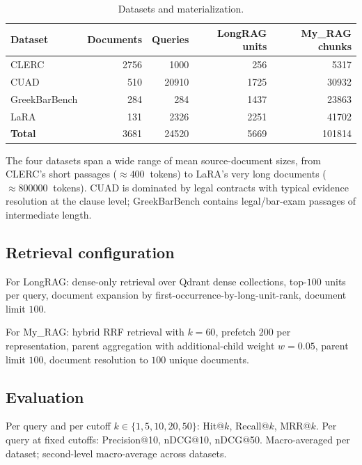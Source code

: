 \documentclass[11pt,a4paper]{article}
\begin{document}
\begin{table}[h]
\centering
\caption{Datasets and materialization.}
\label{tab:datasets}
\small
\begin{tabular}{l r r r r}
\toprule
\textbf{Dataset} & \textbf{Documents} & \textbf{Queries}
  & \textbf{LongRAG units} & \textbf{My\_RAG chunks} \\
\midrule
CLERC              & \num{2756} & \num{1000}  & \num{256}   & \num{5317} \\
CUAD               & \num{510}  & \num{20910} & \num{1725}  & \num{30932} \\
GreekBarBench      & \num{284}  & \num{284}   & \num{1437}  & \num{23863} \\
LaRA               & \num{131}  & \num{2326}  & \num{2251}  & \num{41702} \\
\midrule
\textbf{Total}     & \num{3681} & \num{24520} & \num{5669}  & \num{101814} \\
\bottomrule
\end{tabular}
\end{table}

The four datasets span a wide range of mean source-document sizes,
from CLERC's short passages ($\approx \SI{400}{}$ tokens) to LaRA's
very long documents ($\approx \SI{800000}{}$ tokens). CUAD is
dominated by legal contracts with typical evidence resolution at the
clause level; GreekBarBench contains legal/bar-exam passages of
intermediate length.

\subsection{Retrieval configuration}
For LongRAG: dense-only retrieval over Qdrant dense collections,
top-$100$ units per query, document expansion by
first-occurrence-by-long-unit-rank, document limit $100$.

For My\_RAG: hybrid RRF retrieval with $k=60$, prefetch $200$ per
representation, parent aggregation with additional-child weight
$w = 0.05$, parent limit $100$, document resolution to $100$
unique documents.

\subsection{Evaluation}
Per query and per cutoff $k \in \{1, 5, 10, 20, 50\}$: Hit@$k$,
Recall@$k$, MRR@$k$. Per query at fixed cutoffs: Precision@10,
nDCG@10, nDCG@50. Macro-averaged per dataset; second-level
macro-average across datasets.
\end{document}

